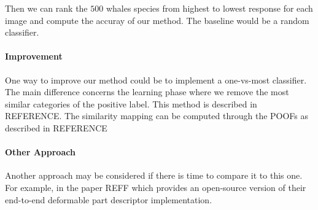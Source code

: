 \documentclass[11pt,a4paper,oneside]{report}
\begin{document}
Then we can rank the $500$ whales species from highest to lowest response for each image and compute the accuray of our method. The baseline would be a random classifier. 

\paragraph{Improvement}

One way to improve our method could be to implement a one-vs-most classifier. The main difference concerns the learning phase where we remove the most similar categories of the positive label. This method is described in REFERENCE. The similarity mapping can be computed through the POOFs as described in REFERENCE

\paragraph{Other Approach}

Another approach may be considered if there is time to compare it to this one. For example, in the paper REFF which provides an open-source version of their end-to-end deformable part descriptor implementation.
\end{document}
